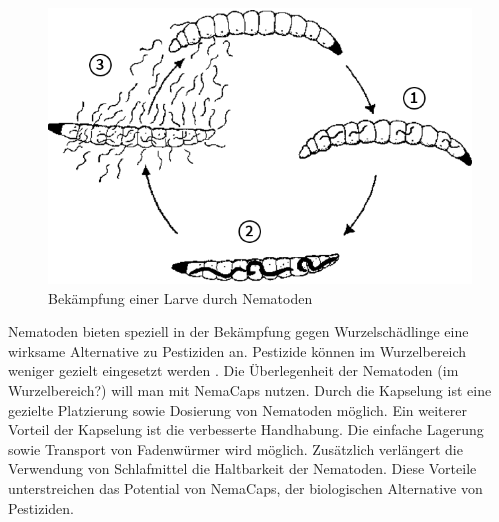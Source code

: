 \begin{figure}
	\includegraphics[scale=0.4]{Illustrationen/3-Einleitung/zyklus_nematoden.png}
\caption{Bekämpfung einer Larve durch Nematoden}
\label{fig:zyklus_Nematoden}
\end{figure}

	
Nematoden bieten speziell in der Bekämpfung gegen Wurzelschädlinge eine wirksame Alternative zu Pestiziden an. Pestizide können im Wurzelbereich weniger gezielt eingesetzt werden \cite{nfp}. Die Überlegenheit der Nematoden (im Wurzelbereich?) will man mit NemaCaps nutzen. Durch die Kapselung ist eine gezielte Platzierung sowie Dosierung von Nematoden möglich. Ein weiterer Vorteil der Kapselung ist die verbesserte Handhabung. Die einfache Lagerung sowie Transport von Fadenwürmer wird möglich.  Zusätzlich verlängert die Verwendung von Schlafmittel die Haltbarkeit der Nematoden. Diese Vorteile unterstreichen das Potential von NemaCaps, der biologischen Alternative von Pestiziden.
